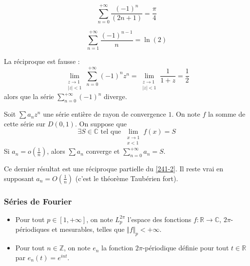   \begin{application}
    \[ \sum_{n=0}^{+\infty} \frac{(-1)^n}{(2n+1)} = \frac{\pi}{4} \]
  \end{application}

  \begin{application}
    \[ \sum_{n=1}^{+\infty} \frac{(-1)^{n-1}}{n} = \ln(2) \]
  \end{application}

  \begin{cexample}
    La réciproque est fausse :
    \[ \lim_{\substack{z \rightarrow 1 \\ \vert z \vert < 1}} \sum_{n=0}^{+\infty} (-1)^n z^n = \lim_{\substack{z \rightarrow 1 \\ \vert z \vert < 1}} \frac{1}{1+z} = \frac{1}{2} \]
    alors que la série $\sum_{n=0}^{+\infty} (-1)^n$ diverge.
  \end{cexample}

  \begin{theorem}
    Soit $\sum a_n z^n$ une série entière de rayon de convergence $1$. On note $f$ la somme de cette série sur $D(0,1)$. On suppose que
    \[ \exists S \in \mathbb{C} \text{ tel que } \lim_{\substack{x \rightarrow 1 \\ x < 1}} f(x) = S \]
    Si $a_n = o \left( \frac{1}{n} \right)$, alors $\sum a_n$ converge et $\sum_{n=0}^{+\infty} a_n = S$.
  \end{theorem}

  \begin{remark}
    Ce dernier résultat est une réciproque partielle du \cref{241-2}. Il reste vrai en supposant $a_n = O \left( \frac{1}{n} \right)$ (c'est le théorème Taubérien fort).
  \end{remark}

  \subsubsection{Séries de Fourier}


  \begin{notation}
    \begin{itemize}
      \item Pour tout $p \in [1, +\infty]$, on note $L_p^{2\pi}$ l'espace des fonctions $f : \mathbb{R} \rightarrow \mathbb{C}$, $2\pi$-périodiques et mesurables, telles que $\Vert f \Vert_p < +\infty$.
      \item Pour tout $n \in \mathbb{Z}$, on note $e_n$ la fonction $2\pi$-périodique définie pour tout $t \in \mathbb{R}$ par $e_n(t) = e^{int}$.
    \end{itemize}
  \end{notation}

